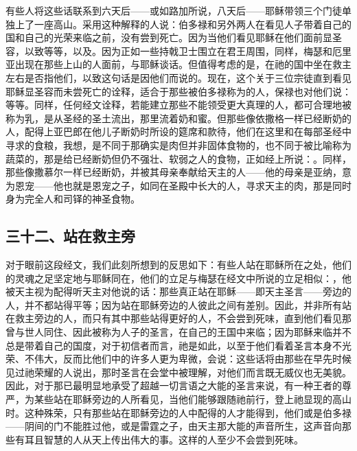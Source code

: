 有些人将这些话联系到六天后——或如路加所说，八天后——耶稣带领三个门徒单独上了一座高山。采用这种解释的人说：伯多禄和另外两人在看见人子带着自己的国和自己的光荣来临之前，没有尝到死亡。因为当他们看见耶稣在他们面前显圣容，以致等等，以及。因为正如一些持戟卫士围立在君王周围，同样，梅瑟和厄里亚出现在那些上山的人面前，与耶稣谈话。但值得考虑的是，在祂的国中坐在救主左右是否指他们，以致这句话是因他们而说的。现在，这个关于三位宗徒直到看见耶稣显圣容而未尝死亡的诠释，适合于那些被伯多禄称为的人，保禄也对他们说：等等。同样，任何经文诠释，若能建立那些不能领受更大真理的人，都可合理地被称为乳，是从圣经的圣土流出，那里流着奶和蜜。但那些像依撒格一样已经断奶的人，配得上亚巴郎在他儿子断奶时所设的筵席和款待，他们在这里和在每部圣经中寻求的食粮，我想，是不同于那确实是肉但并非固体食物的，也不同于被比喻称为蔬菜的，那是给已经断奶但仍不强壮、软弱之人的食物，正如经上所说：。同样，那些像撒慕尔一样已经断奶，并被其母亲奉献给天主的人——他的母亲是亚纳，意为恩宠——他也就是恩宠之子，如同在圣殿中长大的人，寻求天主的肉，那是同时身为完全人和司铎的神圣食物。\par


\subsection{三十二、站在救主旁}

对于眼前这段经文，我们此刻所想到的反思如下：有些人站在耶稣所在之处，他们的灵魂之足坚定地与耶稣同在，他们的立足与梅瑟在经文中所说的立足相似：，他被天主视为配得听天主对他说的话：那些真正站在耶稣——即天主圣言——旁边的人，并不都站得平等；因为站在耶稣旁边的人彼此之间有差别。因此，并非所有站在救主旁边的人，而只有其中那些站得更好的人，不会尝到死味，直到他们看见那曾与世人同住、因此被称为人子的圣言，在自己的王国中来临；因为耶稣来临并不总是带着自己的国度，对于初信者而言，祂是如此，以至于他们看着圣言本身不光荣、不伟大，反而比他们中的许多人更为卑微，会说：这些话将由那些在早先时候见过祂荣耀的人说出，那时圣言在会堂中被理解，对他们而言既无威仪也无美貌。因此，对于那已最明显地承受了超越一切言语之大能的圣言来说，有一种王者的尊严，为某些站在耶稣旁边的人所看见，当他们能够跟随祂前行，登上祂显现的高山时。这种殊荣，只有那些站在耶稣旁边的人中配得的人才能得到，他们或是伯多禄——阴间的门不能胜过他，或是雷霆之子，由天主那大能的声音所生，这声音向那些有耳且智慧的人从天上传出伟大的事。这样的人至少不会尝到死味。\par

